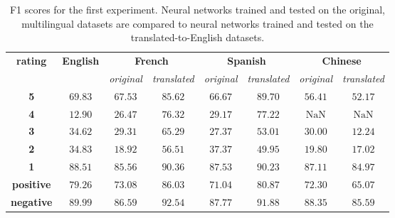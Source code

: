 \documentclass[11pt,a4paper]{article}
\newcommand{\nan}{\mathrm{NaN}}
\begin{document}
    \begin{table*}[ht!]
        \centering
        \begin{tabular}{cccccccc}
            \toprule
                \multirow[c]{2}{*}{\textbf{rating}} &
                \multirow[c]{2}{*}{\textbf{English}} &
                \multicolumn{2}{c}{\textbf{French}} &
                \multicolumn{2}{c}{\textbf{Spanish}} &
                \multicolumn{2}{c}{\textbf{Chinese}} \\
                 & &
                \multicolumn{1}{c}{\textit{original}} & \multicolumn{1}{c}{\textit{translated}} &
                \multicolumn{1}{c}{\textit{original}} & \multicolumn{1}{c}{\textit{translated}} &
                \multicolumn{1}{c}{\textit{original}} & \multicolumn{1}{c}{\textit{translated}} \\
            \midrule
                \textbf{5} & $69.83$ & $67.53$ & $85.62$ & $66.67$ & $89.70$ & $56.41$ & $52.17$\\
                \textbf{4} & $12.90$ & $26.47$ & $76.32$ & $29.17$ & $77.22$  & $\nan$ & $\nan$\\
                \textbf{3} & $34.62$ & $29.31$ & $65.29$ & $27.37$ & $53.01$ & $30.00$ & $12.24$\\
                \textbf{2} & $34.83$ & $18.92$ & $56.51$ & $37.37$ & $49.95$ & $19.80$ & $17.02$\\
                \textbf{1} & $88.51$ & $85.56$ & $90.36$ & $87.53$ & $90.23$ & $87.11$ & $84.97$\\
            \midrule
                \textbf{positive} & $79.26$ & $73.08$ & $86.03$ & $71.04$ & $80.87$ & $72.30$ & $65.07$\\
                \textbf{negative} & $89.99$ & $86.59$ & $92.54$ & $87.77$ & $91.88$ & $88.35$ & $85.59$\\
            \bottomrule
        \end{tabular}
        \caption{F1 scores for the first experiment. Neural networks trained and tested on the original, multilingual datasets are compared to neural networks trained and tested on the translated-to-English datasets.}
        \label{Experiment1}
    \end{table*}
    
\end{document}
